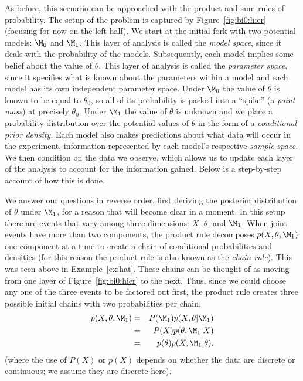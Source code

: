 As before, this scenario can be approached with the product and sum rules of probability. The setup of the problem is captured by Figure~\ref{fig:bi0:hier} (focusing for now on the left half). We start at the initial fork with two potential models: $\M_0$ and $\M_1$. This layer of analysis is called the \textit{model space}, since it deals with the probability of the models. Subsequently, each model implies some belief about the value of $\theta$. This layer of analysis is called the \textit{parameter space}, since it specifies what is known about the parameters within a model and each model has its own independent parameter space. Under $\M_0$ the value of $\theta$ is known to be equal to $\theta_0$, so all of its probability is packed into a ``spike'' (a \emph{point mass}) at precisely $\theta_0$. Under $\M_1$ the value of $\theta$ is unknown and we place a probability distribution over the potential values of $\theta$ in the form of a \emph{conditional prior density}. Each model also makes predictions about what data will occur in the experiment, information represented by each model's respective \textit{sample space.} We then condition on the data we observe, which allows us to update each layer of the analysis to account for the information gained. Below is a step-by-step account of how this is done.

We answer our questions in reverse order, first deriving the posterior distribution of $\theta$ under $\M_1$, for a reason that will become clear in a moment. 
In this setup there are events that vary among three dimensions: $X$, $\theta$, and $\M_1$. When joint events have more than two components, the product rule decomposes $p(X,\theta,\M_1)$ one component at a time to create a chain of conditional probabilities and densities (for this reason the product rule is also known as the \textit{chain rule}). This was seen above in Example~\ref{ex:hat}. These chains can be thought of as moving from one layer of Figure~\ref{fig:bi0:hier} to the next. Thus, since we could choose any one of the three events to be factored out first, the product rule creates three possible initial chains with two probabilities per chain,
\begin{eqnarray*}
p(X,\theta,\M_1) & = & P(\M_1)p(X,\theta|\M_1)   \\
                 & = & P(X)p(\theta,\M_1|X)      \\
                 & = & p(\theta)p(X,\M_1|\theta).
\end{eqnarray*}
(where the use of $P(X)$ or $p(X)$ depends on whether the data are discrete or continuous; we assume they are discrete here).

